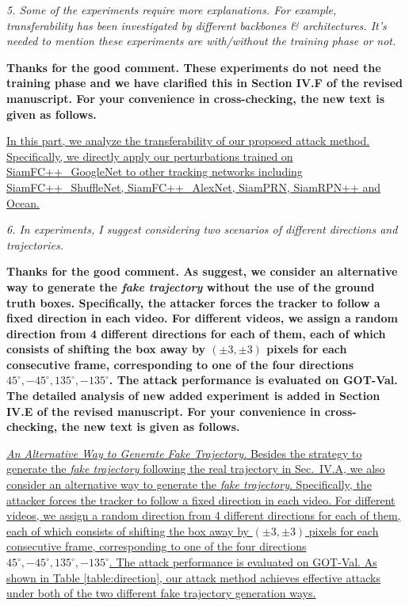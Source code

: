 \documentclass[12pt]{article}
\begin{document}
\textit{5. Some of the experiments require more explanations. For example, transferability has been investigated by different backbones \& architectures. It's needed to mention these experiments are with/without the training phase or not.}

\textbf{Thanks for the good comment. These experiments do not need the training phase and we have clarified this in Section IV.F of the revised manuscript. For your convenience in cross-checking, the new text is given as follows.}

\uline{In this part, we analyze the transferability of our proposed attack method. Specifically, we directly apply our perturbations trained on SiamFC++\_GoogleNet to other tracking networks including SiamFC++\_ShuffleNet, SiamFC++\_AlexNet, SiamPRN, SiamRPN++ and Ocean.}

\textit{6. In experiments, I suggest considering two scenarios of different directions and trajectories.}

\textbf{Thanks for the good comment. As suggest, we consider an alternative way to generate the \textit{fake trajectory} without the use of the ground truth boxes.
Specifically, the attacker forces the tracker to follow a fixed direction in each video. For different videos, we assign a random direction from 4 different directions for each of them, each of which consists of shifting the box away by $(\pm 3, \pm 3)$ pixels for each consecutive frame, corresponding to one of the four directions $45^{\circ}, -45^{\circ}, 135^{\circ}, -135^{\circ}$. The attack performance is evaluated on GOT-Val.
The detailed analysis of new added experiment is added in Section IV.E of the revised manuscript. For your convenience in cross-checking, the new text is given as follows.}

\uline{\textit{An Alternative Way to Generate Fake Trajectory.}  Besides the strategy to generate the \textit{fake trajectory} following the real trajectory in Sec.~IV.A, we also consider an alternative way to generate the \textit{fake trajectory}.
Specifically, the attacker forces the tracker to follow a fixed direction in each video. For different videos, we assign a random direction from 4 different directions for each of them, each of which consists of shifting the box away by $(\pm 3, \pm 3)$ pixels for each consecutive frame, corresponding to one of the four directions $45^{\circ}, -45^{\circ}, 135^{\circ}, -135^{\circ}$. The attack performance is evaluated on GOT-Val. As shown in Table \ref{table:direction}, our attack method achieves effective attacks under both of the two different fake trajectory generation ways.}
\end{document}

